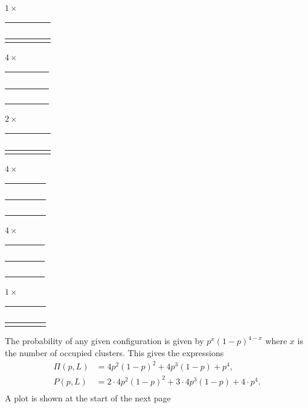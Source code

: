 \documentclass[a4paper, 11pt, notitlepage, english]{article}
\begin{document}
\begin{center}
$1\times$
\begin{tabular}{|c|c|}
  \hline
  \ \ \ &  \ \ \  \\ \hline
  \qquad & \qquad \\
  \hline
\end{tabular} \qquad
\qquad $4\times$
\begin{tabular}{|c|c|}
  \hline
  \ \ \cellcolor{black} &  \ \ \  \\ \hline
  \ \ \ & \qquad \\
  \hline
\end{tabular} \qquad 
\qquad $2\times$
\begin{tabular}{|c|c|}
  \hline
  \ \ \ & \cellcolor{black} \ \ \  \\ \hline
  \cellcolor{black} & \qquad \\
  \hline
\end{tabular}	

$4\times$
\begin{tabular}{|c|c|}
  \hline
  \ \ \cellcolor{black}&  \ \ \  \\ \hline
  \ \ \cellcolor{black} & \qquad \\
  \hline
\end{tabular} \qquad
\qquad $4\times$
\begin{tabular}{|c|c|}
  \hline
  \  \cellcolor{black} & \cellcolor{black} \ \ \  \\ \hline
  \ \  \cellcolor{black} & \qquad \\
  \hline
\end{tabular} \qquad 
\qquad $1\times$
\begin{tabular}{|c|c|}
  \hline
  \ \ \cellcolor{black} & \cellcolor{black} \ \ \  \\ \hline
  \cellcolor{black} & \cellcolor{black} \qquad \\
  \hline
\end{tabular}	
\end{center}
The probability of any given configuration is given by $p^x(1-p)^{4-x}$ where $x$ is the number of occupied clusters. This gives the expressions
\begin{align*}
\Pi(p, L) &= 4p^2(1-p)^2 + 4p^3(1-p) + p^4, \\
P(p, L) &= 2\cdot 4p^2(1-p)^2 + 3\cdot 4p^3(1-p) + 4\cdot p^4. \\
\end{align*}
A plot is shown at the start of the next page 
\end{document}
